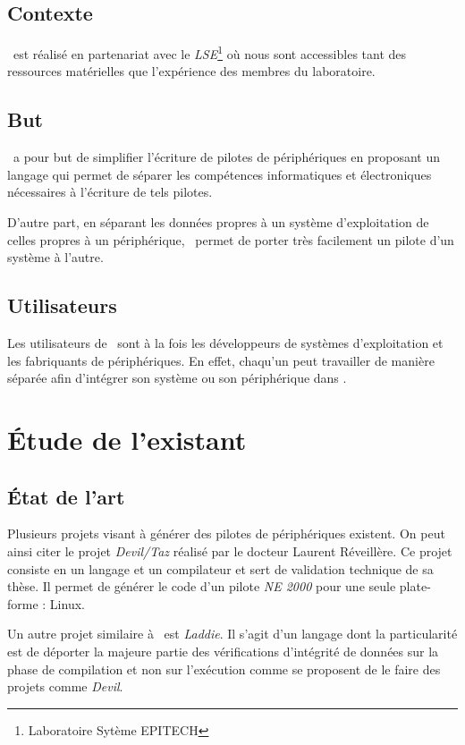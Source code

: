 \documentclass[francais]{rtxreport}
\begin{document}
\section{Contexte}
\rtx\ est réalisé en partenariat avec le \emph{LSE}\footnote{Laboratoire Sytème
EPITECH} où nous sont accessibles tant des ressources matérielles que
l'expérience des membres du laboratoire.

\section{But}
\rtx\ a pour but de simplifier l'écriture de pilotes de périphériques en
proposant un langage qui permet de séparer les compétences informatiques et
électroniques nécessaires à l'écriture de tels pilotes.

D'autre part, en séparant les données propres à un système d'exploitation de
celles propres à un périphérique, \rtx\ permet de porter très facilement un
pilote d'un système à l'autre.

\section{Utilisateurs}
Les utilisateurs de \rtx\ sont à la fois les développeurs de systèmes
d'exploitation et les fabriquants de périphériques. En effet, chaqu'un peut
travailler de manière séparée afin d'intégrer son système ou son périphérique
dans \rtx.

\chapter{Étude de l'existant}

\section{État de l'art}
Plusieurs projets visant à générer des pilotes de périphériques existent. On
peut ainsi citer le projet \emph{Devil/Taz} réalisé par le docteur Laurent
Réveillère. Ce projet consiste en un langage et un compilateur et sert de
validation technique de sa thèse. Il permet de générer le code d'un pilote
\emph{NE 2000} pour une seule plate-forme : Linux.

Un autre projet similaire à \rtx\ est \emph{Laddie}. Il s'agit d'un langage dont
la particularité est de déporter la majeure partie des vérifications d'intégrité
de données sur la phase de compilation et non sur l'exécution comme se proposent
de le faire des projets comme \emph{Devil}.
\end{document}
